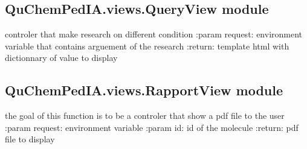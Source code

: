 \documentclass[letterpaper,10pt,english]{sphinxmanual}
\begin{document}
\subsection{QuChemPedIA.views.QueryView module}
\label{\detokenize{QuChemPedIA.views:module-QuChemPedIA.views.QueryView}}\label{\detokenize{QuChemPedIA.views:quchempedia-views-queryview-module}}

\begin{fulllineitems}
\label{\detokenize{QuChemPedIA.views:QuChemPedIA.views.QueryView.build_url}}
\end{fulllineitems}


\begin{fulllineitems}
\label{\detokenize{QuChemPedIA.views:QuChemPedIA.views.QueryView.query}}
controler that make research on different condition
:param request: environment variable that contains arguement of the research
:return: template html with dictionnary of value to display

\end{fulllineitems}



\subsection{QuChemPedIA.views.RapportView module}
\label{\detokenize{QuChemPedIA.views:module-QuChemPedIA.views.RapportView}}\label{\detokenize{QuChemPedIA.views:quchempedia-views-rapportview-module}}

\begin{fulllineitems}
\label{\detokenize{QuChemPedIA.views:QuChemPedIA.views.RapportView.rapport}}
the goal of this function is to be a controler that show a pdf file to the user
:param request: environment variable
:param id: id of the molecule
:return: pdf file to display

\end{fulllineitems}
\end{document}
